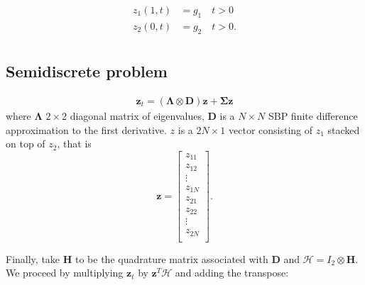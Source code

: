 \documentclass[12pt]{article}
\begin{document}
\begin{flushleft}
\begin{align*}
z_1(1, t) &= g_1 \quad t>0 \\
z_2(0,t) &= g_2  \quad t>0.\\
\end{align*}

\subsection*{Semidiscrete problem}

\begin{align*}
\mathbf{z}_t = (\boldsymbol{\Lambda} \otimes \boldsymbol{D}) \mathbf{z} + \boldsymbol{\Sigma} \mathbf{z} 
\end{align*}
where $\boldsymbol{\Lambda}$ $2 \times 2$ diagonal matrix of eigenvalues, $\boldsymbol{D}$ is a $N\times N$ SBP finite difference approximation to the first derivative. $z$ is a $2N\times 1$ vector consisting of $z_1$ stacked on top of $z_2$, that is
$$\mathbf{z} = \begin{bmatrix}
z_{11}\\
z_{12}\\
\vdots \\
z_{1N}\\
z_{21}\\
z_{22}\\
\vdots \\
z_{2N}\\
\end{bmatrix}.$$

Finally, take $\boldsymbol{H}$ to be the quadrature matrix associated with $\mathbf{D}$ and $\mathcal{H} = I_2 \otimes \boldsymbol{H}$. We proceed by multiplying $\mathbf{z}_t$ by $\mathbf{z}^{T}\mathcal{H}$ and adding the transpose:


\end{flushleft}
\end{document}
